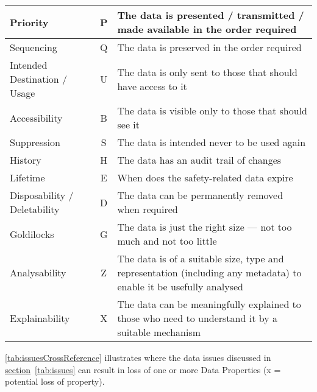 \begin{longtable}{|L{}|C{}|L{}|}
  {Priority} & P & {The data is presented / transmitted / made available in the order required}\\\hline
  {Sequencing} & Q & {The data is preserved in the order required}\\\hline
  {Intended Destination / Usage} & U & {The data is only sent to those that should have
  access to
  it}\\\hline
  {Accessibility} & B & {The data is visible only to those that should see it}\\\hline
  {Suppression} & S & {The data is intended never to be used again}\\\hline
  {History} & H & {The data has an audit trail of changes}\\\hline
  {Lifetime} & E & {When does the safety-related data expire}\\\hline
  {Disposability / Deletability} & D & {The data can be permanently removed when required}\\\hline
  {Goldilocks} & G & {The data is just the right size --- not too much and not too little}\\\hline
  {Analysability} & Z & {The data is of a suitable size, type and representation (including any metadata) to enable it be usefully analysed}\\\hline
  {Explainability} & X & {The data can be meaningfully explained to those who need to understand it by a suitable mechanism}\\\hline
\end{longtable}

\clearpage
\autoref{tab:issuesCrossReference} illustrates where the data issues discussed in
\hyperref[tab:issues]{section}~\ref{tab:issues} %
can result in
loss of one or more Data Properties (x = potential loss of property).

